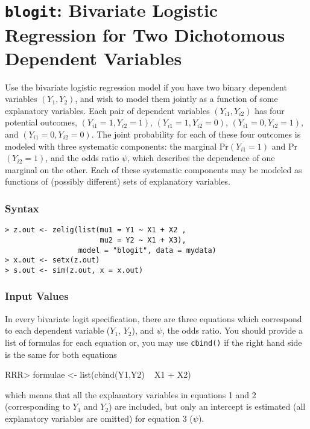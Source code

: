 \section{{\tt blogit}: Bivariate Logistic Regression for Two
Dichotomous Dependent Variables}\label{blogit}

Use the bivariate logistic regression model if you have two binary
dependent variables $(Y_1, Y_2)$, and wish to model them jointly as a
function of some explanatory variables.  Each pair of dependent
variables $(Y_{i1}, Y_{i2})$ has four potential outcomes, $(Y_{i1}=1,
Y_{i2}=1)$, $(Y_{i1}=1, Y_{i2}=0)$, $(Y_{i1}=0, Y_{i2}=1)$, and
$(Y_{i1}=0, Y_{i2}=0)$.  The joint probability for each of these four
outcomes is modeled with three systematic components: the marginal
Pr$(Y_{i1} = 1)$ and Pr$(Y_{i2} = 1)$, and the odds ratio $\psi$,
which describes the dependence of one marginal on the other.  Each of
these systematic components may be modeled as functions of (possibly
different) sets of explanatory variables.

\subsubsection{Syntax}

\begin{verbatim}
> z.out <- zelig(list(mu1 = Y1 ~ X1 + X2 , 
                      mu2 = Y2 ~ X1 + X3), 
                 model = "blogit", data = mydata)
> x.out <- setx(z.out)
> s.out <- sim(z.out, x = x.out)
\end{verbatim}

\subsubsection{Input Values}

In every bivariate logit specification, there are three equations which
correspond to each dependent variable ($Y_1$, $Y_2$), and $\psi$, the
odds ratio. You should provide a list of formulas for each equation or, 
you may use {\tt cbind()} if the right hand side is the same for both equations
\begin{Schunk}
\begin{Sinput}
RRR> formulae <- list(cbind(Y1,Y2) ~ X1 + X2)
\end{Sinput}
\end{Schunk}
which means that all the explanatory variables in equations 1 and 2
(corresponding to $Y_1$ and $Y_2$) are included, but only an intercept
is estimated (all explanatory variables are omitted) for equation 3
($\psi$).  

